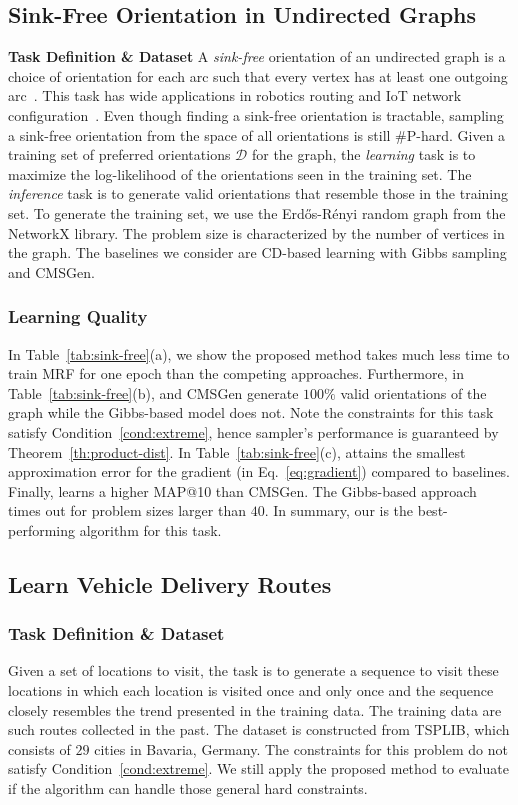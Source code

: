\subsection{Sink-Free Orientation in Undirected Graphs}
\noindent\textbf{Task Definition \& Dataset}  A \textit{sink-free} orientation of an undirected graph is a choice of orientation for each arc such that every vertex has at least one outgoing arc~\citep{DBLP:journals/combinatorics/CohnPP02}. This task has wide applications in robotics routing and IoT network configuration~\citep{takahashi2009communication}. Even though finding a sink-free orientation is tractable, sampling a sink-free orientation from the space of all orientations is still \#P-hard. Given a training set of preferred orientations $\mathcal{D}$ for the graph, the \textit{learning} task is to maximize the log-likelihood of the orientations seen in the training set. The \textit{inference} task is to generate valid orientations that resemble those in the training set. To generate the training set, we use the Erd\H{o}s-R\'enyi random graph  from the NetworkX library. The problem size is characterized by the number of vertices in the graph. The baselines we consider are CD-based learning with Gibbs sampling and CMSGen.

\subsubsection*{Learning Quality} In Table~\ref{tab:sink-free}(a), we show the proposed \nls method takes much
less time to train MRF for one epoch than the competing approaches.
Furthermore, in Table~\ref{tab:sink-free}(b), \nls and CMSGen generate $100\%$
valid orientations of the graph while the Gibbs-based model does not.
%
Note the constraints for this task satisfy Condition~\ref{cond:extreme}, hence
\nls sampler's performance is guaranteed by Theorem~\ref{th:product-dist}.
%
In Table~\ref{tab:sink-free}(c), \nls attains the smallest approximation error
for the gradient (in Eq.~\ref{eq:gradient}) compared to baselines. Finally,
\nls learns a higher MAP@10 than CMSGen. The Gibbs-based approach times out for
problem sizes larger than $40$. In summary, our \nls is the best-performing
algorithm for this task.

\subsection{Learn Vehicle Delivery Routes}
\subsubsection*{Task Definition \&  Dataset} Given a set of locations to visit, the task is to generate a sequence to visit
these locations in which each location is visited once and only once and the
sequence closely resembles the trend presented in the training data. The
training data are such routes collected in the past. The dataset is constructed
from TSPLIB, which consists of $29$ cities in Bavaria, Germany. The constraints
for this problem do not satisfy Condition~\ref{cond:extreme}. We still apply
the proposed method to evaluate if the \nls algorithm can handle those general
hard constraints.

